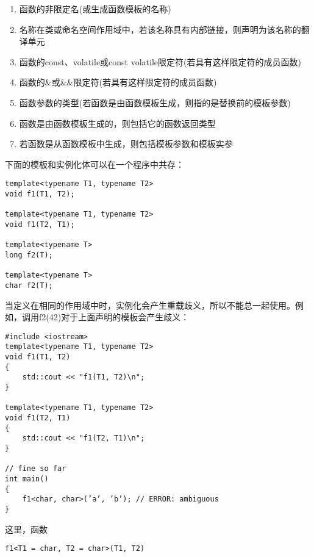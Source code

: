 \begin{enumerate}
\item 
函数的非限定名(或生成函数模板的名称)

\item 
名称在类或命名空间作用域中，若该名称具有内部链接，则声明为该名称的翻译单元

\item 
函数的const、volatile或const volatile限定符(若具有这样限定符的成员函数)

\item 
函数的\&或\&\&限定符(若具有这样限定符的成员函数)

\item 
函数参数的类型(若函数是由函数模板生成，则指的是替换前的模板参数)

\item 
函数是由函数模板生成的，则包括它的函数返回类型

\item 
若函数是从函数模板中生成，则包括模板参数和模板实参
\end{enumerate}

下面的模板和实例化体可以在一个程序中共存：

\begin{lstlisting}[style=styleCXX]
template<typename T1, typename T2>
void f1(T1, T2);

template<typename T1, typename T2>
void f1(T2, T1);

template<typename T>
long f2(T);

template<typename T>
char f2(T);
\end{lstlisting}

当定义在相同的作用域中时，实例化会产生重载歧义，所以不能总一起使用。例如，调用f2(42)对于上面声明的模板会产生歧义：

\begin{lstlisting}[style=styleCXX]
#include <iostream>
template<typename T1, typename T2>
void f1(T1, T2)
{
	std::cout << "f1(T1, T2)\n";
}

template<typename T1, typename T2>
void f1(T2, T1)
{
	std::cout << "f1(T2, T1)\n";
}

// fine so far
int main()
{
	f1<char, char>(’a’, ’b’); // ERROR: ambiguous
}
\end{lstlisting}

这里，函数

\begin{lstlisting}[style=styleCXX]
f1<T1 = char, T2 = char>(T1, T2)
\end{lstlisting}

